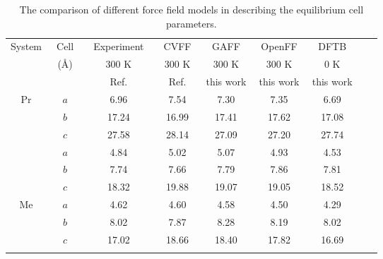 \documentclass[prb,superscriptaddress,longbibliography, twocolumn]{revtex4-1}
\begin{document}
\begin{table}[ht]
  \centering
  \caption{The comparison of different force field models in describing the equilibrium cell parameters. }
\begin{tabular}{ccccccccc}
\hline\hline
System& ~Cell~ &~Experiment~ & ~CVFF~ & ~GAFF~ & ~OpenFF~ & ~DFTB~ \\ 
              & (\AA)      & 300 K         &  300 K     & 300 K       & 300 K     & 0 K \\ 
              &    & Ref. \cite{devarapalli2019remarkably} & Ref. \cite{devarapalli2019remarkably}& this work& this work &  this work \\ \hline
\multirow{4}{*}{Pr}  & $a$      & 6.96  & 7.54     & 7.30  &  7.35  &  6.69  \\
                     & $b$      & 17.24 & 16.99    & 17.41 &  17.62 &  17.08 \\ 
                     & $c$      & 27.58 & 28.14    & 27.09 &  27.20 &  27.74 \\ \hline
\multirow{4}{*}{Et}  & $a$      & 4.84  & 5.02     & 5.07  &  4.93  &  4.53  \\  
                     & $b$      & 7.74  & 7.66     & 7.79  &  7.86  &  7.81  \\ 
                     & $c$      & 18.32 & 19.88    & 19.07 &  19.05 & 18.52  \\ \hline
\multirow{4}{*}{Me}  & $a$      & 4.62  & 4.60     & 4.58  & 4.50   &  4.29  \\ 
                     & $b$      & 8.02  & 7.87     & 8.28  & 8.19   &  8.02  \\ 
                     & $c$      & 17.02 & 18.66    & 18.40 & 17.82  &  16.69 \\ \hline\hline
\label{table2}
\end{tabular}
\end{table}
\end{document}
